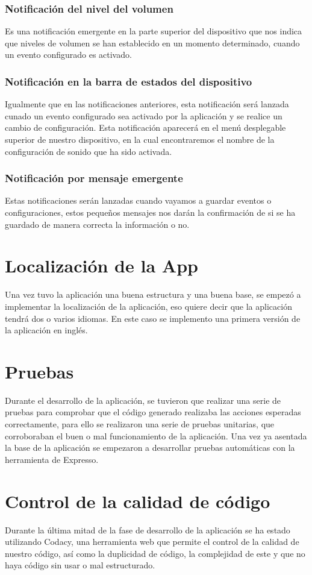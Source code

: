 \subsubsection{Notificación del nivel del volumen}
Es una notificación emergente en la parte superior del dispositivo que nos indica que  niveles de volumen se han establecido en un momento determinado, cuando un evento configurado es activado.\cite{audiomanager}
\subsubsection{Notificación en la barra de estados del dispositivo}
Igualmente que en las notificaciones anteriores, esta notificación será lanzada cunado un evento configurado sea activado por la aplicación y se realice un cambio de configuración. Esta notificación aparecerá en el menú desplegable superior de nuestro dispositivo, en la cual encontraremos el nombre de la configuración de sonido que ha sido activada.\cite{notificacion}
\subsubsection{Notificación por mensaje emergente}
Estas notificaciones serán lanzadas cuando vayamos a guardar eventos o configuraciones, estos pequeños mensajes nos darán la confirmación de si se ha guardado de manera correcta la información o no.\cite{toast}

\section{Localización de la App}
Una vez tuvo la aplicación una buena estructura y una buena base, se empezó a implementar la localización de la aplicación, eso quiere decir que la aplicación tendrá dos o varios idiomas. En este caso se implemento una primera versión de la aplicación en inglés.

\section{Pruebas}
Durante el desarrollo de la aplicación, se tuvieron que realizar una serie de pruebas para comprobar que el código generado realizaba las acciones esperadas correctamente, para ello se realizaron una serie de pruebas unitarias, que corroboraban el buen o mal funcionamiento de la aplicación. Una vez ya asentada la base de la aplicación se empezaron a desarrollar pruebas automáticas con la herramienta de Expresso.

\section{Control de la calidad de código}
Durante la última mitad de la fase de desarrollo de la aplicación se ha estado utilizando Codacy, una herramienta web que permite el control de la calidad de nuestro código, así como la duplicidad de código, la complejidad de este y que no haya código sin usar o mal estructurado.